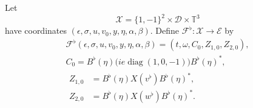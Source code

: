 Let
\[
 \mathcal X=\{1,-1\}^2\times\mathcal D\times\mathbb T^3
\]
have coordinates $(\epsilon,\sigma,u,v_0,y,\eta,\alpha,\beta)$.
Define $\mathcal F^\flat:\mathcal X\to\mathcal E$ by
\begin{equation}
 \begin{gathered}
 \mathcal F^\flat(\epsilon,\sigma,u,v_0,y,\eta,\alpha,\beta)
       =(t,\omega,C_0,Z_{1,0},Z_{2,0}),\\
 C_0=B^\flat(\eta)\bigl(ie\operatorname{diag}(1,0,-1)\bigr)
                                    B^\flat(\eta)^*,\\
 \begin{aligned}
 Z_{1,0}&=B^\flat(\eta)X(v^\flat)B^\flat(\eta)^*,\\
 Z_{2,0}&=B^\flat(\eta)X(w^\flat)B^\flat(\eta)^*.
 \end{aligned}
 \end{gathered}
 \label{sgd:smooth-addon:literal-forward}
\end{equation}

